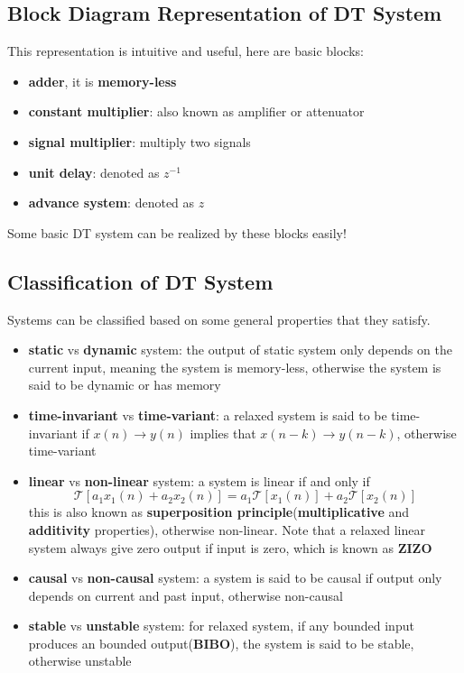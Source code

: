 \documentclass[10pt,a4paper,oneside]{article}
\begin{document}
\subsection{Block Diagram Representation of DT System}
This representation is intuitive and useful, here are basic blocks:
\begin{itemize}
	\item \textbf{adder}, it is \textbf{memory-less}
	\item \textbf{constant multiplier}: also known as amplifier or attenuator
	\item \textbf{signal multiplier}: multiply two signals
	\item \textbf{unit delay}: denoted as $z^{-1}$
	\item \textbf{advance system}: denoted as $z$
\end{itemize}
Some basic DT system can be realized by these blocks easily!

\subsection{Classification of DT System}
Systems can be classified based on some general properties that they satisfy.
\begin{itemize}
	\item \textbf{static} vs \textbf{dynamic} system: the output of static system only depends on the current input, meaning the system is memory-less, otherwise the system is said to be dynamic or has memory
	\item \textbf{time-invariant} vs \textbf{time-variant}: a relaxed system is said to be time-invariant if $x(n) \rightarrow y(n)$ implies that $x(n-k) \rightarrow y(n-k)$, otherwise time-variant
	\item \textbf{linear} vs \textbf{non-linear} system: a system is linear if and only if
	\[
	\mathcal{T}[a_1 x_1(n) + a_2 x_2(n)] = a_1 \mathcal{T}[x_1(n)] + a_2 \mathcal{T}[x_2(n)]
	\]
	this is also known as \textbf{superposition principle}(\textbf{multiplicative} and \textbf{additivity} properties), otherwise non-linear. Note that a relaxed linear system always give zero output if input is zero, which is known as \textbf{ZIZO}
	\item \textbf{causal} vs \textbf{non-causal} system: a system is said to be causal if output only depends on current and past input, otherwise non-causal
	\item \textbf{stable} vs \textbf{unstable} system: for relaxed system, if any bounded input produces an bounded output(\textbf{BIBO}), the system is said to be stable, otherwise unstable
\end{itemize}
\end{document}
